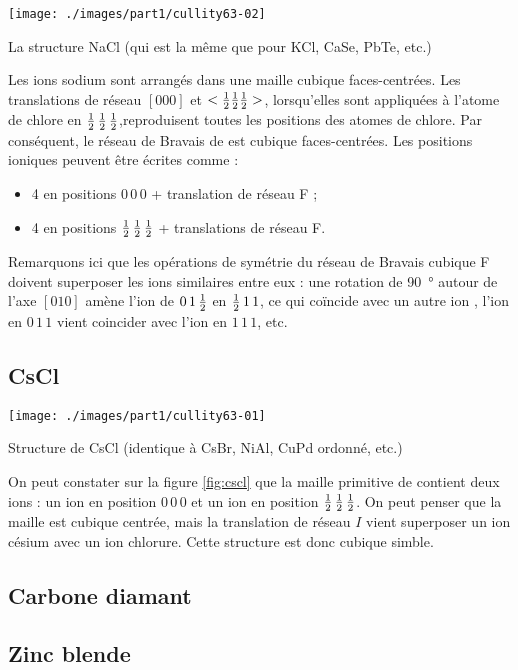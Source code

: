 \begin{marginfigure}
    \texttt{[image: ./images/part1/cullity63-02]}
    \caption{La structure NaCl (qui est la même que pour KCl, CaSe, PbTe, etc.)}
    \label{fig:nacl}
\end{marginfigure}

Les ions sodium sont arrangés dans une maille cubique faces-centrées. Les translations de réseau $[000]$ et $<\mbox{$\frac{1}{2}$}\mbox{$\frac{1}{2}$}\mbox{$\frac{1}{2}$}>$, lorsqu'elles sont appliquées à l'atome de chlore en $\mbox{$\frac{1}{2}$}\,\mbox{$\frac{1}{2}$}\,\mbox{$\frac{1}{2}$}$,reproduisent toutes les positions des atomes de chlore. Par conséquent, le réseau de Bravais de  est cubique faces-centrées. Les positions ioniques peuvent être écrites comme :

\begin{itemize}
    \item 4 en positions $0\,0\,0$ + translation de réseau F ;
    \item 4 en positions $\mbox{$\frac{1}{2}$}\,\mbox{$\frac{1}{2}$}\,\mbox{$\frac{1}{2}$}$ + translations de réseau F.
\end{itemize}

Remarquons ici que les opérations de symétrie du réseau de Bravais cubique F doivent superposer les ions similaires entre eux : une rotation de \SI{90}{\degree} autour de l'axe $[010]$ amène l'ion  de $0\,1\,\mbox{$\frac{1}{2}$}$ en $\mbox{$\frac{1}{2}$}\,1\,1$, ce qui coïncide avec un autre ion , l'ion  en $0\,1\,1$ vient coincider avec l'ion  en $1\,1\,1$, etc.

\subsection{CsCl}

\begin{marginfigure}
    \texttt{[image: ./images/part1/cullity63-01]}
    \caption{Structure de CsCl (identique à CsBr, NiAl, CuPd ordonné, etc.)}
    \label{fig:cscl}
\end{marginfigure}

On peut constater sur la figure \ref{fig:cscl} que la maille primitive de  contient deux ions : un ion  en position $0\,0\,0$ et un ion  en position $\mbox{$\frac{1}{2}$}\,\mbox{$\frac{1}{2}$}\,\mbox{$\frac{1}{2}$}$. On peut penser que la maille est cubique centrée, mais la translation de réseau $I$ vient superposer un ion césium avec un ion chlorure. Cette structure est donc cubique simble.

\subsection{Carbone diamant}
\subsection{Zinc blende}
